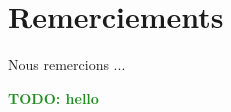 \documentclass[12pt,a4paper,oneside]{report}
\newcommand{\todo}[1]{\textcolor{ForestGreen}{\textbf{TODO: #1}}}
\begin{document}



\chapter*{Remerciements}
\renewcommand{\leftmark}{REMERCIEMENTS}

    Nous remercions ...\\

\newpage

\renewcommand{\leftmark}{TABLE DES MATI\`{E}RES}
\thispagestyle{fancy}
\tableofcontents

\newpage
\listoffigures
{}
%
\newpage
\todo{hello}

\newpage


%

{}


%
%
%
\end{document}
